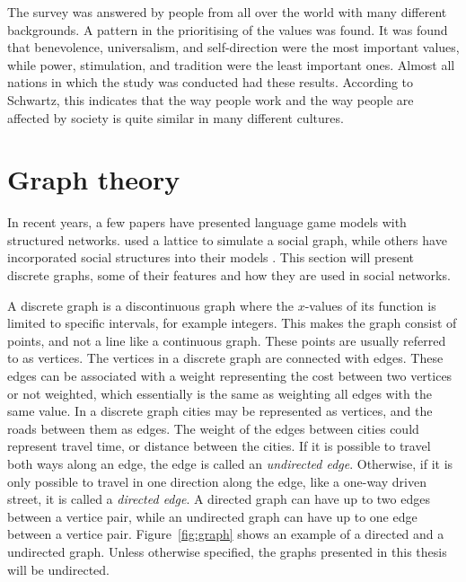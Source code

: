 The survey was answered by people from all over the world with many different backgrounds. A pattern in the prioritising of the values was found. It was found that benevolence, universalism, and self-direction were the most important values, while power, stimulation, and tradition were the least important ones. Almost all nations in which the study was conducted had these results. According to Schwartz, this indicates that the way people work and the way people are affected by society is quite similar in many different cultures.


\section{Graph theory}
In recent years, a few papers have presented language game models with structured networks. \citet{lipowska2011naming} used a lattice to simulate a social graph, while others have incorporated social structures into their models \citep{lekvam2014co, gong2004computational}. This section will present discrete graphs, some of their features and how they are used in social networks.

A discrete graph is a discontinuous graph where the $x$-values of its function is limited to specific intervals, for example integers. This makes the graph consist of points, and not a line like a continuous graph. These points are usually referred to as vertices. The vertices in a discrete graph are connected with edges. These edges can be associated with a weight representing the cost between two vertices or not weighted, which essentially is the same as weighting all edges with the same value. In a discrete graph cities may be represented as vertices, and the roads between them as edges. The weight of the edges between cities could represent travel time, or distance between the cities. If it is possible to travel both ways along an edge, the edge is called an \textit{undirected edge}. Otherwise, if it is only possible to travel in one direction along the edge, like a one-way driven street, it is called a \textit{directed edge}. A directed graph can have up to two edges between a vertice pair, while an undirected graph can have up to one edge between a vertice pair. Figure~\ref{fig:graph} shows an example of a directed and a undirected graph. Unless otherwise specified, the graphs presented in this thesis will be undirected.

